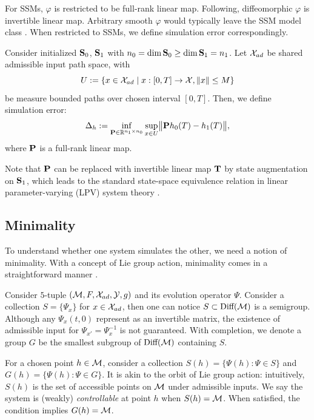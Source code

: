 For SSMs, $\varphi$ is restricted to be full-rank linear map.
Following, diffeomorphic $\varphi$ is invertible linear map.
Arbitrary smooth $\varphi$ would typically leave the SSM model class \cite{krener1977decomposition,toth2010modeling}.
When restricted to SSMs, we define simulation error correspondingly.
\begin{definition}
\label{def:SSM_sim_error}
    Consider initialized $\mathbf{S}_0$, $\mathbf{S}_1$ with $n_0 = \dim \mathbf{S}_0 \ge \dim \mathbf{S}_1 = n_1$.
    Let $\mathcal{X}_{ad}$ be shared admissible input path space, with
    \begin{equation*}
        U := \{x \in \mathcal{X}_{ad} \mid x: [0,T] \to \mathcal{X}, \|x\| \le M\}
    \end{equation*}
    be measure bounded paths over chosen interval $[0,T]$.
    Then, we define simulation error:
    \begin{equation}
    \label{eq:SSM_sim_error}
    \Delta_h := \inf_{\mathbf{P} \in \mathbb{R}^{n_1 \times n_0}} \sup_{x \in U} \bigl\| \mathbf{P}h_0(T) - h_1(T) \bigr\|,
    \end{equation}
    where $\mathbf{P}$ is a full-rank linear map.
\end{definition}
Note that $\mathbf{P}$ can be replaced with invertible linear map $\mathbf{T}$
by state augmentation on $\mathbf{S}_1$, which leads to the standard state-space equivalence relation
in linear parameter-varying (LPV) system theory \cite{toth2010modeling}.
\subsection{Minimality}
\label{app:min_detail}
To understand whether one system simulates the other, we need a notion of minimality.
With a concept of Lie group action, minimality comes in a straightforward manner \cite{jurdjevic1972control, krener1977decomposition}.

Consider $5$-tuple $(\mathcal{M},F,\mathcal{X}_{ad},\mathcal{Y},g)$
and its evolution operator $\Psi$.
Consider a collection $S = \{\Psi_x\}$ for $x \in \mathcal{X}_{ad}$,
then one can notice $S \subset \text{Diff}(\mathcal{M})$ is a semigroup.
Although any $\Psi_x(t,0)$ represent as an invertible matrix,
the existence of admissible input for $\Psi_{x'} = \Psi_x^{-1}$ is not guaranteed.
With completion, we denote a group $G$ be the smallest subgroup of $\text{Diff}(\mathcal{M})$ containing $S$.

For a chosen point $h \in \mathcal{M}$, consider a collection $S(h) = \{\Psi(h): \Psi \in S\}$ and $G(h) = \{\Psi(h): \Psi \in G\}$.
It is akin to the orbit of Lie group action:
intuitively, $S(h)$ is the set of accessible points on $\mathcal{M}$ under admissible inputs.
We say the system is (weakly) \emph{controllable} at point $h$ when $S(h) = \mathcal{M}$.
When satisfied, the condition implies $G(h) = \mathcal{M}$.

